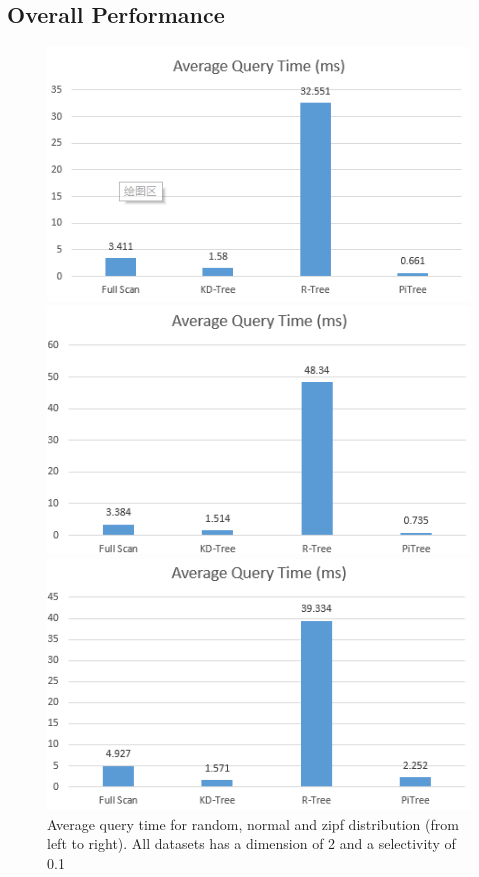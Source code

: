 \documentclass[sigconf,10pt]{acmart}
\begin{document}
\subsection{Overall Performance}

\begin{figure}[ht] 
  \label{overall-performance-qtime} 
  \begin{minipage}[b]{0.33\linewidth}
    \centering
    \includegraphics[width=.8\linewidth]{../figures/overall-performance/random-qtime} 
    \vspace{4ex}
  \end{minipage}%
  \begin{minipage}[b]{0.33\linewidth}
    \centering
    \includegraphics[width=.8\linewidth]{../figures/overall-performance/normal-qtime} 
    \vspace{4ex}
  \end{minipage}%
  \begin{minipage}[b]{0.33\linewidth}
    \centering
    \includegraphics[width=.8\linewidth]{../figures/overall-performance/zipf-qtime} 
    \vspace{4ex}
  \end{minipage}
  \caption{Average query time for random, normal and zipf distribution (from left to right). 
  All datasets has a dimension of 2 and a selectivity of 0.1}
\end{figure}
\end{document}
